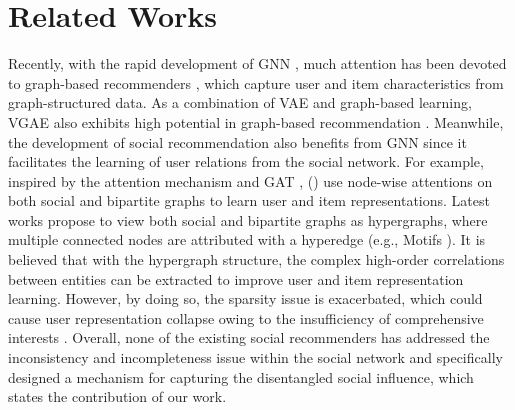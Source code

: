\documentclass[letterpaper]{article} %
\begin{document}
\section{Related Works}
Recently, with the rapid development of GNN \cite{GCN, MPNN, graphsage}, much attention has been devoted to graph-based recommenders \cite{ngcf,lightgcn}, which capture user and item characteristics from graph-structured data. As a combination of VAE and graph-based learning, VGAE \cite{VGAE} also exhibits high potential in graph-based recommendation \cite{vgae_rec}. Meanwhile, the development of social recommendation also benefits from GNN since it facilitates the learning of user relations from the social network. For example, inspired by the attention mechanism \cite{attention} and GAT \cite{GAT}, \citeauthor{diffnet++} (\citeyear{diffnet++}) use node-wise attentions on both social and bipartite graphs to learn user and item representations. Latest works \cite{MHCN, ESRF} propose to view both social and bipartite graphs as hypergraphs, where multiple connected nodes are attributed with a hyperedge (e.g., Motifs \cite{motif}). It is believed that with the hypergraph structure, the complex high-order correlations between entities can be extracted to improve user and item representation learning. However, by doing so, the sparsity issue is exacerbated, which could cause user representation collapse owing to the insufficiency of comprehensive interests \cite{collapse}. Overall, none of the existing social recommenders has addressed the inconsistency and incompleteness issue within the social network and specifically designed a mechanism for capturing the disentangled social influence, which states the contribution of our work.
\end{document}
